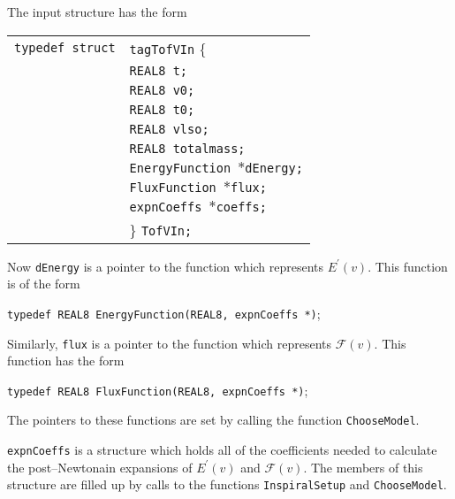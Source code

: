 \documentclass[12pt]{article}
\begin{document}
The input structure has the form

\vspace{5mm}

\begin{tabular}{ll}
\texttt{typedef struct} & \texttt{tagTofVIn} \{ \\
                        & \texttt{REAL8 t;} \\
                        & \texttt{REAL8 v0;} \\
                        & \texttt{REAL8 t0;} \\
                        & \texttt{REAL8 vlso;} \\
                        & \texttt{REAL8 totalmass;} \\
                        & \texttt{EnergyFunction $\ast$dEnergy;}  \\
                        & \texttt{FluxFunction $\ast$flux;}  \\
                        & \texttt{expnCoeffs $\ast$coeffs;}  \\
                        & \} \texttt{TofVIn;}
\end{tabular}

\vspace{5mm}


Now \texttt{dEnergy} is a pointer to the function which represents $E^{\prime}(v)$. This function is of the form

\vspace{5mm}

\texttt{typedef REAL8 EnergyFunction(REAL8, expnCoeffs *)};

\vspace{5mm}

Similarly, \texttt{flux} is a pointer to the function which represents $\mathcal{F}(v)$. This function has the form

\vspace{5mm}

\texttt{typedef REAL8 FluxFunction(REAL8, expnCoeffs *)};

\vspace{5mm}

The pointers to these functions are set by calling the function \texttt{ChooseModel}.

\texttt{expnCoeffs} is a structure which holds all of the coefficients needed to calculate the post--Newtonain expansions of $E^{\prime}(v)$ and $\mathcal{F}(v)$. The members of this structure are filled up by calls to the functions \texttt{InspiralSetup} and \texttt{ChooseModel}.
\end{document}
